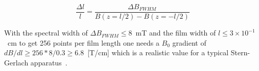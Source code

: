 \begin{equation}
\label{eq:ERI_resolution}
\frac{\Delta l}{l} = \frac{\Delta B_{FWHM}}{B(z=l/2)-B(z=-l/2)}
\end{equation}

With the spectral width of $\Delta B_{FWHM}\leq8$~mT and the film width of $l\leq3\times10^{-1}$~cm to get 
256 points per film length one needs a $B_0$ gradient of $dB/dl \geq 256*8/0.3 \geq 6.8$~[T/cm] which is a realistic value for a typical Stern-Gerlach apparatus~\cite{SternGerlach1922,Liang_2020}. 
